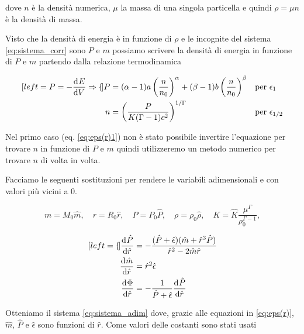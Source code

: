 \documentclass[a4paper, titlepage]{article}
\begin{document}
dove $n$ è la densità numerica, $\mu$ la massa di una singola particella e quindi $\rho = \mu n$ è la densità di massa.


Visto che la densità di energia è in funzione di $\rho$ e le incognite del sistema \ref{eq:sistema_corr} sono $P$ e $m$ possiamo scrivere la densità di energia in funzione di $P$ e $m$ partendo dalla relazione termodinamica

\begin{subequations}
    \label{eq:eps(r)}
    \begin{align}[left = {P = - \dv[]{E}{V} \Rightarrow \empheqlbrace}]
        P &= (\alpha - 1) a \left( \frac{n}{n_0} \right)^{\alpha} + (\beta - 1) b \left( \frac{n}{n_0} \right)^{\beta} && \text{per } \epsilon_1 \label{eq:eps(r)1} \\
        n &= \left( \frac{P}{K(\Gamma - 1) c^2} \right)^{1 / \Gamma} && \text{per } \epsilon_{1/2} \label{eq:eps(r)23}
    \end{align}
\end{subequations}

Nel primo caso (eq. \ref{eq:eps(r)1}) non è stato possibile invertire l'equazione per trovare $n$ in funzione di $P$ e $m$ quindi utilizzeremo un metodo numerico per trovare $n$ di volta in volta.

Facciamo le seguenti sostituzioni per rendere le variabili adimensionali e con valori più vicini a 0.

\begin{equation*}
    m=M_0\hat m, \quad 
    r=R_0\hat r, \quad 
    P=P_0\hat P, \quad
    \rho=\rho_0 \hat{\rho}, \quad
    K = \hat{K}\frac{\mu^\Gamma}{\rho_0^{\Gamma-1}},
\end{equation*}

\begin{subequations}
    \begin{align}[left = {\empheqlbrace}]
        \dv[]{\hat P}{\hat r} &= - \frac{(\hat P + \hat{\epsilon})(\hat m + \hat r^3 \hat P)}{\hat r^2-2\hat m\hat r} \label{eq:P_ad} \\
        \dv[]{\hat m}{\hat r} &= \hat r^2 \hat{\epsilon} \label{eq:m_ad} \\
        \dv[]{\Phi}{\hat r} &= - \frac{1}{\hat P + \hat{\epsilon}} \dv[]{\hat P}{\hat r} \label{eq:Phi_ad}
    \end{align}
    \label{eq:sistema_adim}
\end{subequations}

Otteniamo il sistema \ref{eq:sistema_adim} dove, grazie alle equazioni in \ref{eq:eps(r)}, $\hat m$, $\hat P$ e $\hat{\epsilon}$ sono funzioni di $\hat r$. Come valori delle costanti sono stati usati
\end{document}
